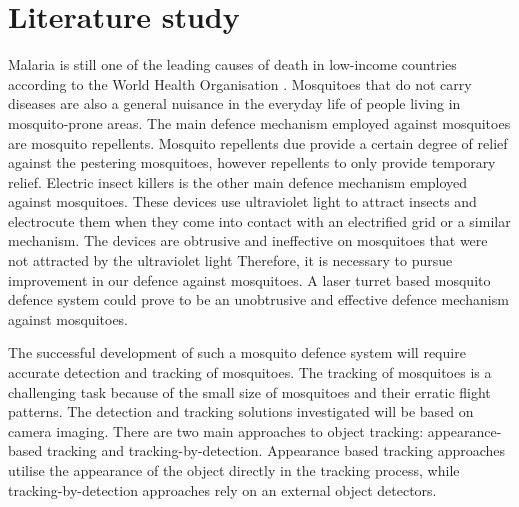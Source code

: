 
\section{Literature study}

Malaria is still one of the leading causes of death in low-income countries according to the World Health Organisation \cite{WHO2020}. Mosquitoes that do not carry diseases are also a general nuisance in the everyday life of people living in mosquito-prone areas. The main defence mechanism employed against mosquitoes are mosquito repellents. Mosquito repellents due provide a certain degree of relief against the pestering mosquitoes, however repellents to only provide temporary relief. Electric insect killers is the other main defence mechanism employed against mosquitoes. These devices use ultraviolet light to attract insects and electrocute them when they come into contact with an electrified grid or a similar mechanism. The devices are obtrusive and ineffective on mosquitoes that were not attracted by the ultraviolet light Therefore, it is necessary to pursue improvement in our defence against mosquitoes. A laser turret based mosquito defence system could prove to be an unobtrusive and effective defence mechanism against mosquitoes.

The successful development of such a mosquito defence system will require accurate detection and tracking of mosquitoes. The tracking of mosquitoes is a challenging task because of the small size of mosquitoes and their erratic flight patterns. The detection and tracking solutions investigated will be based on camera imaging. There are two main approaches to object tracking: appearance-based tracking and tracking-by-detection. Appearance based tracking approaches utilise the appearance of the object directly in the tracking process, while tracking-by-detection approaches rely on an external object detectors.

